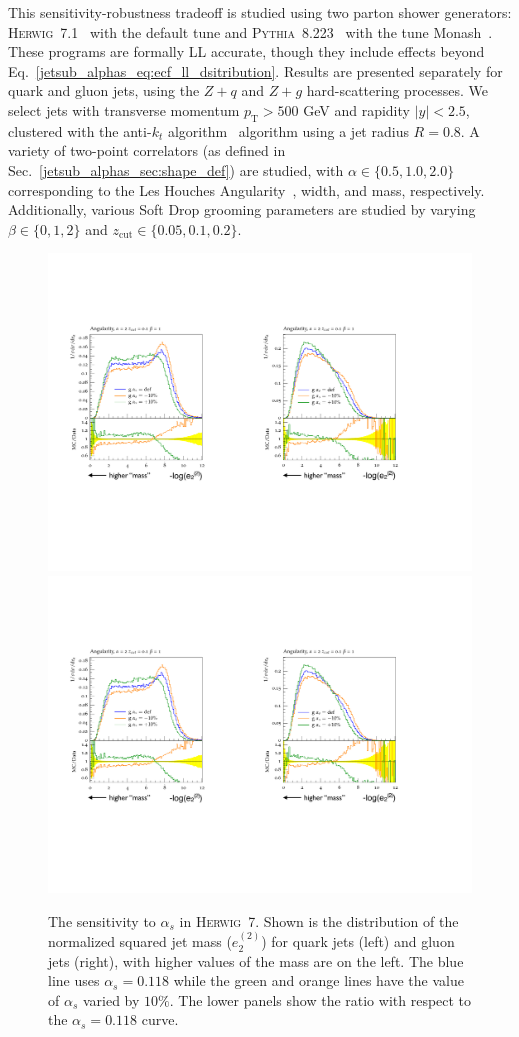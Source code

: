 \documentclass[11pt]{cernrep}
\begin{document}
This sensitivity-robustness tradeoff is studied using two parton shower generators: \textsc{Herwig~7}.1~\cite{Bellm:2015jjp,Reichelt:2017hts} with the default tune and \textsc{Pythia~8}.223~\cite{Sjostrand:2006za,Sjostrand:2014zea} with the tune Monash~\cite{Skands:2014pea}.  
%
These programs are formally LL accurate, though they include effects beyond Eq.~\ref{jetsub_alphas_eq:ecf_ll_dsitribution}.
%
Results are presented separately for quark and gluon jets, using the $Z+q$ and $Z+g$ hard-scattering processes.
%
We select jets with transverse momentum $p_\mathrm{T}>500$ GeV and rapidity $|y|<2.5$, clustered with the anti-$k_t$ algorithm~\cite{Cacciari:2008gp} algorithm using a jet radius $R=0.8$.
%
A variety of two-point correlators (as defined in Sec.~\ref{jetsub_alphas_sec:shape_def}) are studied, with $\alpha\in\{0.5,1.0, 2.0\}$ corresponding to the Les Houches Angularity~\cite{Gras:2017jty}, width, and mass, respectively. 
%
Additionally, various Soft Drop grooming parameters are studied by varying $\beta\in\{0,1,2\}$ and $z_\mathrm{cut}\in \{0.05,0.1,0.2\}$.  

\begin{figure}[t]
\begin{center}
\includegraphics[width = 0.49\columnwidth]{jetsub_alphas_sensitivity2a.pdf}\includegraphics[width = 0.48\columnwidth]{jetsub_alphas_sensitivity2b.pdf}
\end{center}
\caption{The sensitivity to $\alpha_s$ in \textsc{Herwig~7}.  Shown is the distribution of the normalized squared jet mass ($e_2^{(2)}$) for quark jets (left) and gluon jets (right), with higher values of the mass are on the left.  The blue line uses $\alpha_s=0.118$ while the green and orange lines have the value of $\alpha_s$ varied by $10\%$.  The lower panels show the ratio with respect to the $\alpha_s=0.118$ curve.}
\label{jetsub_alphas_fig:sensitivity}
\end{figure}
\end{document}
